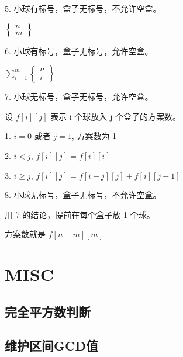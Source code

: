 \documentclass[a4paper]{article}
\begin{document}
5. 小球有标号，盒子无标号，不允许空盒。

   $\begin{Bmatrix}n\\ m\end{Bmatrix}$

6. 小球有标号，盒子无标号，允许空盒。

   $\sum\limits_{i=1}^m\begin{Bmatrix}n\\ i\end{Bmatrix}$

7. 小球无标号，盒子无标号，允许空盒。

   设 $f[i][j]$ 表示 i 个球放入 j 个盒子的方案数。

   1. $i = 0$ 或者 $j = 1$, 方案数为 1

   2. $i < j$, $f[i][j]=f[i][i]$

   3. $i\ge j$, $f[i][j]=f[i-j][j]+f[i][j-1]$

8. 小球无标号，盒子无标号，不允许空盒。

   用 7 的结论，提前在每个盒子放 1 个球。

   方案数就是 $f[n-m][m]$
\section{MISC}
\subsection{完全平方数判断}

\subsection{维护区间GCD值}

\end{document}

